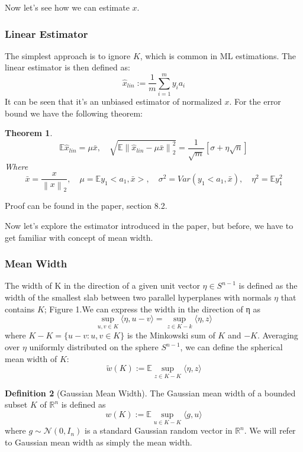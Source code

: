 \documentclass{amsart}
\newtheorem{theorem}{Theorem}[section]
\theoremstyle{definition}
\newtheorem{definition}[theorem]{Definition}
\theoremstyle{remark}
\numberwithin{equation}{section}
\newcommand\norm[1]{\left\lVert#1\right\rVert}
\begin{document}
Now let's see how we can estimate $x$.
\subsubsection{\textbf{Linear Estimator}} 
The simplest approach is to ignore $K$, which is common in ML estimations. The linear estimator is then defined as:
\[
\hat{x}_{lin} := \frac{1}{m} \sum_{i=1}^m y_i a_i
\]
It can be seen that it's an unbiased estimator of normalized $x$. For the error bound we have the following theorem:
\begin{theorem}
\[
\mathbb{E} \hat{x}_{lin} = \mu \bar{x},\quad \sqrt{\mathbb{E}\norm{\hat{x}_{lin}-\mu\bar{x}}_2^2} = \frac{1}{\sqrt{m}}[\sigma+\eta\sqrt{n}]
\]
Where
\[
\bar{x} = \frac{x}{\norm{x}_2},\quad \mu = \mathbb{E}y_1<a_1,\bar{x}>,\quad \sigma^2= Var(y_1<a_1,\bar{x}),\quad \eta^2 = \mathbb{E} y_1^2
\]
\end{theorem}

Proof can be found in the paper, section 8.2.\\
\par Now let's explore the estimator introduced in the paper, but before, we have to get familiar with concept of mean width.

\subsubsection{\textbf{Mean Width}}  The width of K in the direction of a given unit vector $\eta\in S^{n-1}$ is defined as the width of the smallest slab between two parallel hyperplanes with normals $\eta$ that contains $K$; Figure 1.We can express the width in the direction of η as 
\[
\sup_{u,v \in K} \langle \eta, u-v \rangle = \sup_{z \in K-k} \langle \eta, z \rangle
\]
where $K −K = \{u − v : u, v \in K\}$ is the Minkowski sum of $K$ and $−K$. Averaging over $\eta$ uniformly distributed on the sphere $S^{n−1}$, we can define the spherical mean width of $K$:
\[
\tilde{w}(K) :=\mathbb{E} \sup_{z\in K−K} \langle \eta , z\rangle \]

\begin{definition}[Gaussian Mean Width]
 The Gaussian mean width of a bounded subset $K$ of $\mathbb{R}^n$ is defined as
\[w(K) :=\mathbb{E} \sup_{u\in K − K} \langle g, u \rangle \]
where $ g \sim \mathcal{N}(0, I_n)$ is a standard Gaussian random vector in $\mathbb{R}^n$. We will refer to Gaussian mean width as simply the mean width.
\end{definition}
\end{document}
